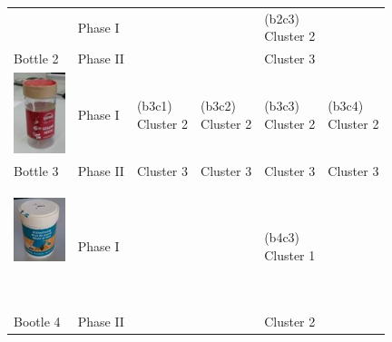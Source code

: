\begin{table}
\begin{tabular}{p{1.6cm} p{1.6cm}|p{2cm} p{2cm} p{2cm}  p{2cm} }
         & Phase I  &           &           &{\vspace{-0.7cm}}\pbox{2cm}{(b2c3) \\Cluster 2} &           \\
Bottle 2 & Phase II &           &           &       Cluster 3 &           \\ \hline
{\parbox[c]{1em}{\includegraphics[width=1.5cm]{./fig_cha4/b3.jpg}} }
         & Phase I  &{\vspace{-0.7cm}}\pbox{2cm}{(b3c1) \\Cluster 2} &{\vspace{-0.7cm}}\pbox{2cm}{(b3c2) \\Cluster 2} &{\vspace{-0.7cm}}\pbox{2cm}{(b3c3) \\Cluster 2} &{\vspace{-0.7cm}}\pbox{2cm}{(b3c4) \\Cluster 2} \\
Bottle 3 & Phase II &       Cluster 3 &       Cluster 3 &       Cluster 3 &       Cluster 3 \\ \hline
{\parbox[c]{1em}{\includegraphics[width=1.5cm]{./fig_cha4/b4.jpg}}\newline }
         & Phase I  &           &           &{\vspace{-0.7cm}}\pbox{2cm}{(b4c3) \\Cluster 1} &           \\
Bootle 4 & Phase II &           &           &       Cluster 2 &           \\ \hline
\end{tabular}
\label{tab:cluster}
\end{table}



